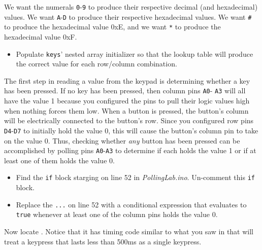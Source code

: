 We want the numerals \texttt{0}-\texttt{9} to produce their respective decimal
(and hexadecimal) values. We want \texttt{A}-\texttt{D} to produce their
respective hexadecimal values. We want \texttt{\#} to produce the hexadecimal
value 0xE, and we want \texttt{*} to produce the hexadecimal value 0xF.

    \begin{itemize}
    \item Populate \lstinline{keys}' nested array initializer so that the
        lookup table will produce the correct value for each row/column
        combination.
    \end{itemize}

The first step in reading a value from the keypad is determining whether a key
has been pressed. If no key has been pressed, then column pins \texttt{A0}-
\texttt{A3} will all have the value 1 because you configured the pins to pull
their logic values high when nothing forces them low. When a button is pressed,
the button's column will be electrically connected to the button's row. Since
you configured row pins \texttt{D4}-\texttt{D7} to initially hold the value 0,
this will cause the button's column pin to take on the value 0. Thus, checking
whether \textit{any} button has been pressed can be accomplished by polling
pins \texttt{A0}-\texttt{A3} to determine if each holds the value 1 or if at
least one of them holds the value 0.

    \begin{itemize}
    \item Find the \lstinline{if} block starging on line 52 in
        \textit{PollingLab.ino}. Un-comment this \lstinline{if} block.
    \item Replace the \lstinline{...} on line 52 with a conditional expression
        that evaluates to \texttt{true} whenever at least one of the column
        pins holds the value 0.
    \end{itemize}

Now locate . Notice that it has timing code similar
to what you saw in  that will treat a keypress that
lasts less than 500ms as a single keypress.

